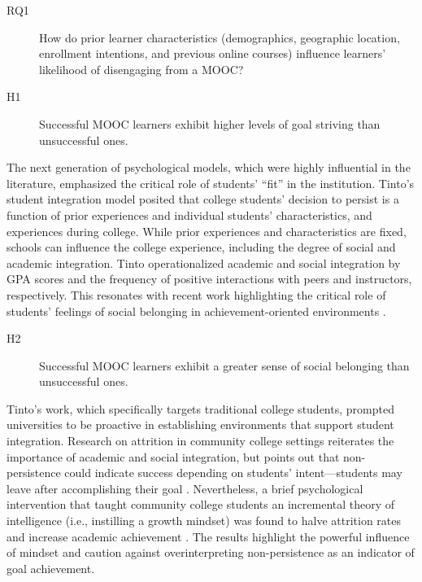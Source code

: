 \documentclass{sigchi}\usepackage[]{graphicx}\usepackage[]{color}
\begin{document}
\begin{description}
  \item[RQ1] How do prior learner characteristics (demographics, geographic location, enrollment intentions, and previous online courses) influence learners' likelihood of disengaging from a MOOC?
  \item[H1] Successful MOOC learners exhibit higher levels of goal striving than unsuccessful ones.
\end{description}

The next generation of psychological models, which were highly influential in the literature, emphasized the critical role of students' ``fit'' in the institution. Tinto's \citeyear{tinto1975dropout} student integration model posited that college students' decision to persist is a function of prior experiences and individual students' characteristics, and experiences during college. While prior experiences and characteristics are fixed, schools can influence the college experience, including the degree of social and academic integration. Tinto operationalized academic and social integration by GPA scores and the frequency of positive interactions with peers and instructors, respectively. This resonates with recent work highlighting the critical role of students' feelings of social belonging in achievement-oriented environments \cite{walton2007question}. 

\begin{description}
  \item[H2] Successful MOOC learners exhibit a greater sense of social belonging than unsuccessful ones.
\end{description}

Tinto's work, which specifically targets traditional college students, prompted universities to be proactive in establishing environments that support student integration. Research on attrition in community college settings reiterates the importance of academic and social integration, but points out that non-persistence could indicate success depending on students' intent---students may leave after accomplishing their goal \cite{bers1991persistence}. Nevertheless, a brief psychological intervention that taught community college students an incremental theory of intelligence (i.e., instilling a growth mindset) was found to halve attrition rates and increase academic achievement \cite{paunesku2012brief}. The results highlight the powerful influence of mindset and caution against overinterpreting non-persistence as an indicator of goal achievement.
\end{document}
